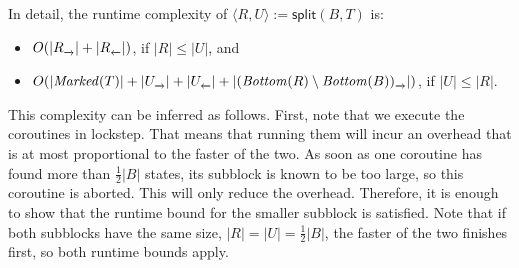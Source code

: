 \documentclass[a4paper,10pt]{article}
\theoremstyle{definition}
\theoremstyle{plain}
\newcommand{\bigo}[1]{{O\!\left(#1\right)}}
\newcommand{\pijl}[1]{\mathrel{\text{$\xrightarrow{\smash[t]{#1}}$}}}
\newcommand{\lijp}[1]{\mathrel{\text{$\xleftarrow{\smash[t]{#1}}$}}}
\newcommand{\size}[1]{\left\lvert #1 \right\rvert}
\newcommand{\Bottom}{\mathit{Bottom}}
\newcommand{\Marked}{\mathit{Marked}}
\begin{document}
\begin{algorithm}[tb]
\begin{algorithmic}[1]
	\end{algorithmic}
	\end{algorithm}


In detail, the runtime complexity of $\langle R, U \rangle := \mathsf{split}(B, T)$ is:
\begin{itemize}
\item $\bigo{\size{R_{\pijl{}}} + \size{R_{\lijp{}}}}$, if $\size{R} \leq \size{U}$,
and
\item $\bigo{\size{\Marked(T)} + \size{U_{\pijl{}}} + \size{U_{\lijp{}}} + \size{(\Bottom(R) \setminus \Bottom(B))_{\pijl{}}}}$, if $\size{U} \leq \size{R}$.
\end{itemize}

This complexity can be inferred as follows.
First, note that we execute the coroutines in lockstep.
That means that running them will incur an overhead that is at most proportional to the faster of the two.
As soon as one coroutine has found more than $\frac{1}{2}\size{B}$ states,
its subblock is known to be too large,
so this coroutine is aborted.
This will only reduce the overhead.
Therefore, it is enough to show that the runtime bound for the smaller subblock is satisfied.
Note that if both subblocks have the same size, $\size{R} = \size{U} = \frac{1}{2} \size{B}$,
the faster of the two finishes first, so both runtime bounds apply.
\end{document}
